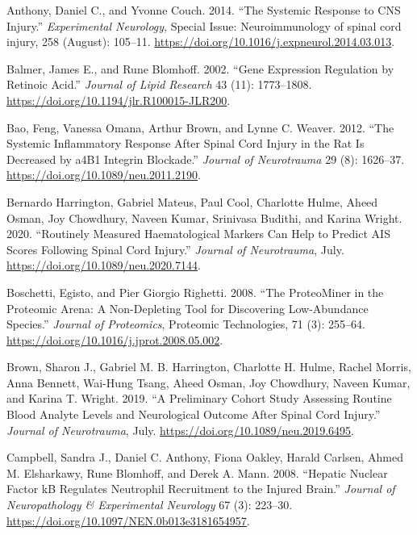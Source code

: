 \documentclass[
]{article}
\newlength{\cslhangindent}
\newlength{\cslentryspacingunit} %
\newenvironment{CSLReferences}[2] %
 {%
  \setlength{\parindent}{0pt}
  \ifodd #1
  \let\oldpar\par
  \def\par{\hangindent=\cslhangindent\oldpar}
  \fi
  \setlength{\parskip}{#2\cslentryspacingunit}
 }%
 {}
\begin{document}
\begin{landscape}
\begin{landscape}
\hypertarget{refs}{}
\begin{CSLReferences}{1}{0}
\leavevmode{}%
Anthony, Daniel C., and Yvonne Couch. 2014. {``The Systemic Response to {CNS} Injury.''} \emph{Experimental Neurology}, Special {Issue}: {Neuroimmunology} of spinal cord injury, 258 (August): 105--11. \url{https://doi.org/10.1016/j.expneurol.2014.03.013}.

\leavevmode{}%
Balmer, James E., and Rune Blomhoff. 2002. {``Gene Expression Regulation by Retinoic Acid.''} \emph{Journal of Lipid Research} 43 (11): 1773--1808. \url{https://doi.org/10.1194/jlr.R100015-JLR200}.

\leavevmode{}%
Bao, Feng, Vanessa Omana, Arthur Brown, and Lynne C. Weaver. 2012. {``The Systemic Inflammatory Response After Spinal Cord Injury in the Rat Is Decreased by {a4B1} Integrin Blockade.''} \emph{Journal of Neurotrauma} 29 (8): 1626--37. \url{https://doi.org/10.1089/neu.2011.2190}.

\leavevmode{}%
Bernardo Harrington, Gabriel Mateus, Paul Cool, Charlotte Hulme, Aheed Osman, Joy Chowdhury, Naveen Kumar, Srinivasa Budithi, and Karina Wright. 2020. {``Routinely Measured Haematological Markers Can Help to Predict {AIS} Scores Following Spinal Cord Injury.''} \emph{Journal of Neurotrauma}, July. \url{https://doi.org/10.1089/neu.2020.7144}.

\leavevmode{}%
Boschetti, Egisto, and Pier Giorgio Righetti. 2008. {``The {ProteoMiner} in the Proteomic Arena: {A} Non-Depleting Tool for Discovering Low-Abundance Species.''} \emph{Journal of Proteomics}, Proteomic {Technologies}, 71 (3): 255--64. \url{https://doi.org/10.1016/j.jprot.2008.05.002}.

\leavevmode{}%
Brown, Sharon J., Gabriel M. B. Harrington, Charlotte H. Hulme, Rachel Morris, Anna Bennett, Wai-Hung Tsang, Aheed Osman, Joy Chowdhury, Naveen Kumar, and Karina T. Wright. 2019. {``A Preliminary Cohort Study Assessing Routine Blood Analyte Levels and Neurological Outcome After Spinal Cord Injury.''} \emph{Journal of Neurotrauma}, July. \url{https://doi.org/10.1089/neu.2019.6495}.

\leavevmode{}%
Campbell, Sandra J., Daniel C. Anthony, Fiona Oakley, Harald Carlsen, Ahmed M. Elsharkawy, Rune Blomhoff, and Derek A. Mann. 2008. {``Hepatic {Nuclear Factor kB Regulates Neutrophil Recruitment} to the {Injured Brain}.''} \emph{Journal of Neuropathology \& Experimental Neurology} 67 (3): 223--30. \url{https://doi.org/10.1097/NEN.0b013e3181654957}.


\end{CSLReferences}
\end{landscape}
\end{landscape}
\end{document}
